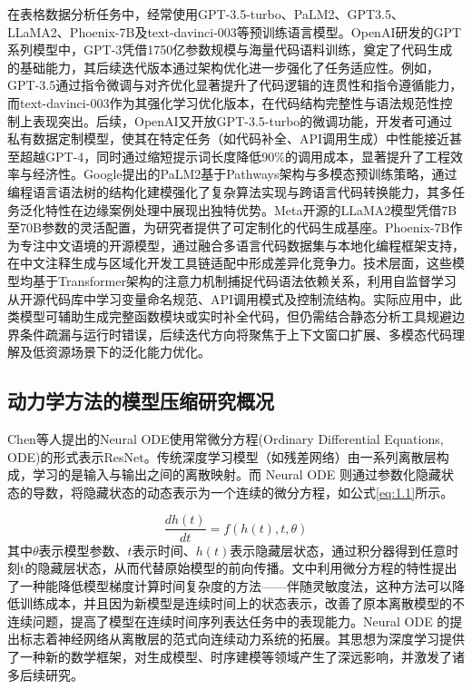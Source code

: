 在表格数据分析任务中，经常使用GPT-3.5-turbo\cite{OpenAIPlatform}、PaLM2\cite{chowdheryPalmScalingLanguage2023}、GPT3.5\cite{OpenAIPlatform}、LLaMA2\cite{touvronLLaMAOpenEfficient2023}、Phoenix-7B\cite{chenPhoenixDemocratizingChatGPT2023}及text-davinci-003\cite{ouyangTrainingLanguageModels2022}等预训练语言模型。OpenAI研发的GPT系列模型中，GPT-3凭借1750亿参数规模与海量代码语料训练，奠定了代码生成的基础能力，其后续迭代版本通过架构优化进一步强化了任务适应性。例如，GPT-3.5通过指令微调与对齐优化显著提升了代码逻辑的连贯性和指令遵循能力，而text-davinci-003作为其强化学习优化版本，在代码结构完整性与语法规范性控制上表现突出。后续，OpenAI又开放GPT-3.5-turbo的微调功能，开发者可通过私有数据定制模型，使其在特定任务（如代码补全、API调用生成）中性能接近甚至超越GPT-4，同时通过缩短提示词长度降低90\%的调用成本，显著提升了工程效率与经济性。Google提出的PaLM2基于Pathways架构与多模态预训练策略，通过编程语言语法树的结构化建模强化了复杂算法实现与跨语言代码转换能力，其多任务泛化特性在边缘案例处理中展现出独特优势。Meta开源的LLaMA2模型凭借7B至70B参数的灵活配置，为研究者提供了可定制化的代码生成基座。Phoenix-7B作为专注中文语境的开源模型，通过融合多语言代码数据集与本地化编程框架支持，在中文注释生成与区域化开发工具链适配中形成差异化竞争力。技术层面，这些模型均基于Transformer架构的注意力机制捕捉代码语法依赖关系，利用自监督学习从开源代码库中学习变量命名规范、API调用模式及控制流结构。实际应用中，此类模型可辅助生成完整函数模块或实时补全代码，但仍需结合静态分析工具规避边界条件疏漏与运行时错误，后续迭代方向将聚焦于上下文窗口扩展、多模态代码理解及低资源场景下的泛化能力优化。

\subsection{动力学方法的模型压缩研究概况}
Chen等人提出的Neural ODE\cite{chenNeuralOrdinaryDifferential}使用常微分方程(Ordinary Differential Equations, ODE)的形式表示ResNet\cite{heDeepResidualLearning2016}。传统深度学习模型（如残差网络）由一系列离散层构成，学习的是输入与输出之间的离散映射。而 Neural ODE 则通过参数化隐藏状态的导数，将隐藏状态的动态表示为一个连续的微分方程，如公式\ref{eq:1.1}所示。

\begin{equation}
\label{eq:1.1}
\frac{{dh(t)}}{{dt}} = f(h(t),t,\theta )
\end{equation}
其中$\theta $表示模型参数、$t$表示时间、$h(t)$表示隐藏层状态，通过积分器得到任意时刻t的隐藏层状态，从而代替原始模型的前向传播。文中利用微分方程的特性提出了一种能降低模型梯度计算时间复杂度的方法——伴随灵敏度法，这种方法可以降低训练成本，并且因为新模型是连续时间上的状态表示，改善了原本离散模型的不连续问题，提高了模型在连续时间序列表达任务中的表现能力。Neural ODE 的提出标志着神经网络从离散层的范式向连续动力系统的拓展。其思想为深度学习提供了一种新的数学框架，对生成模型、时序建模等领域产生了深远影响，并激发了诸多后续研究。

